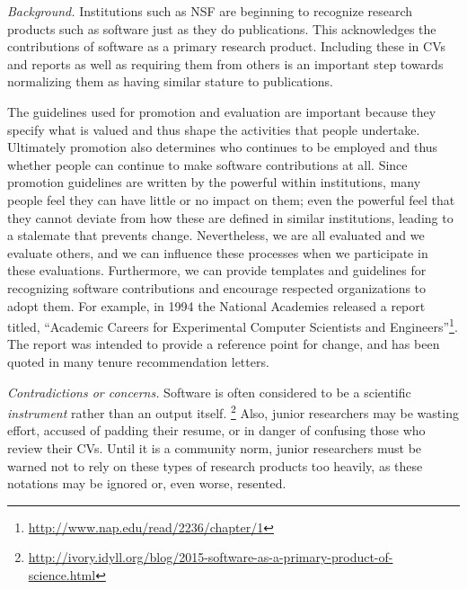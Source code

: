 \documentclass[a4paper,UKenglish]{dagman}
\begin{document}
\emph{Background.}
Institutions such as NSF are beginning to recognize research products such as software just as they do publications. This acknowledges the contributions of software as a primary research product. Including these in CVs and reports as well as requiring them from others is an important step towards normalizing them as having similar stature to publications. 

The guidelines used for promotion and evaluation are important because they specify what is valued and thus shape the activities that people undertake. Ultimately promotion also determines who continues to be employed and thus whether people can continue to make software contributions at all. Since promotion guidelines are written by the powerful within institutions, many people feel they can have little or no impact on them; even the powerful feel that they cannot deviate from how these are defined in similar institutions, leading to a stalemate that prevents change.
Nevertheless, we are all evaluated and we evaluate others, and we can influence these processes when we participate in these evaluations.
Furthermore, we can provide templates and guidelines for recognizing software contributions and encourage respected organizations to adopt them.
For example, in 1994 the National Academies released a report titled, ``Academic Careers for Experimental Computer Scientists and Engineers''\footnote{\url{http://www.nap.edu/read/2236/chapter/1}}. The report was intended to provide a reference point for change, and has been quoted in many tenure recommendation letters.


\emph{Contradictions or concerns.}
Software is often considered to be a scientific \emph{instrument} rather than an output itself.%
\footnote{\url{http://ivory.idyll.org/blog/2015-software-as-a-primary-product-of-science.html}}
Also, junior researchers may be wasting effort, accused of padding their resume, or in danger of confusing those who review their CVs. Until it is a community norm, junior researchers must be warned not to rely on these types of research products too heavily, as these notations may be ignored or, even worse, resented.
\end{document}
